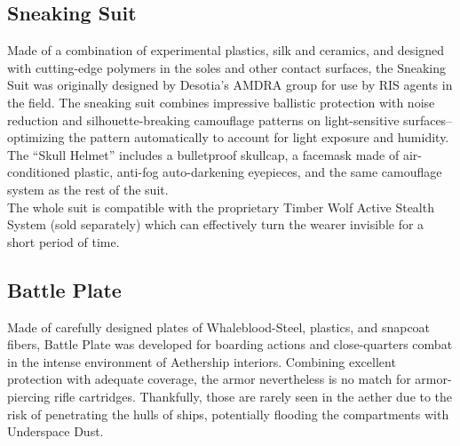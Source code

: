 \documentclass[a4paper, twocolumn, openany]{book}
\begin{document}
{{	\subsection{Sneaking Suit}
	Made of a combination of experimental plastics, silk and ceramics, and designed with
	cutting-edge polymers in the soles and other contact surfaces, the Sneaking Suit was originally
	designed by Desotia’s AMDRA group for use by RIS agents in the field. The sneaking suit
	combines impressive ballistic protection with noise reduction and silhouette-breaking
	camouflage patterns on light-sensitive surfaces--optimizing the pattern automatically to account
	for light exposure and humidity. The “Skull Helmet” includes a bulletproof skullcap, a facemask
	made of air-conditioned plastic, anti-fog auto-darkening eyepieces, and the same camouflage
	system as the rest of the suit.\\
	The whole suit is compatible with the proprietary Timber Wolf Active Stealth System (sold
	separately) which can effectively turn the wearer invisible for a short period of time.\\


	\subsection{Battle Plate}
	Made of carefully designed plates of Whaleblood-Steel, plastics, and snapcoat fibers, Battle
	Plate was developed for boarding actions and close-quarters combat in the intense environment
	of Aethership interiors. Combining excellent protection with adequate coverage, the armor
	nevertheless is no match for armor-piercing rifle cartridges. Thankfully, those are rarely seen in
	the aether due to the risk of penetrating the hulls of ships, potentially flooding the compartments
	with Underspace Dust.\\

}}
\end{document}
